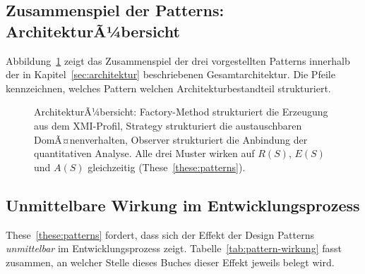 ﻿\documentclass[a4paper,12pt]{report}
\theoremstyle{definition}
\begin{document}
\subsection{Zusammenspiel der Patterns: ArchitekturÃ¼bersicht}

Abbildung~\ref{fig:pattern-architektur} zeigt das Zusammenspiel der drei
vorgestellten Patterns innerhalb der in Kapitel~\ref{sec:architektur}
beschriebenen Gesamtarchitektur. Die Pfeile kennzeichnen, welches Pattern
welchen Architekturbestandteil strukturiert.

\begin{figure}[H]
\centering
{}
\caption{ArchitekturÃ¼bersicht: Factory-Method strukturiert die Erzeugung aus
dem XMI-Profil, Strategy strukturiert die austauschbaren DomÃ¤nenverhalten,
Observer strukturiert die Anbindung der quantitativen Analyse. Alle drei
Muster wirken auf $R(S)$, $E(S)$ und $A(S)$ gleichzeitig (These~\ref{these:patterns}).}
\label{fig:pattern-architektur}
\end{figure}

\subsection{Unmittelbare Wirkung im Entwicklungsprozess}

These~\ref{these:patterns} fordert, dass sich der Effekt der Design Patterns
\emph{unmittelbar} im Entwicklungsprozess zeigt. Tabelle~\ref{tab:pattern-wirkung}
fasst zusammen, an welcher Stelle dieses Buches dieser Effekt jeweils belegt wird.
\end{document}

